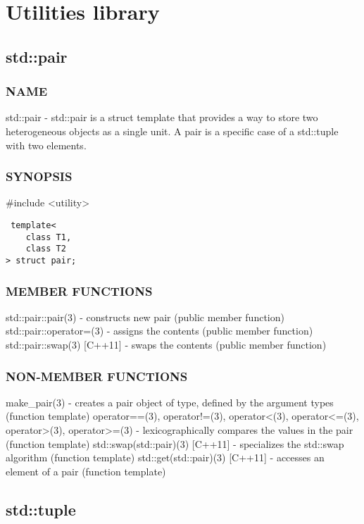 \section{Utilities library}

\subsection{std::pair}

\subsubsection{NAME}
std::pair - std::pair is a struct template that provides a way to store two heterogeneous objects as a single unit. A pair is a specific case of a std::tuple with two elements.

\subsubsection{SYNOPSIS}
\#include <utility>

\begin{lstlisting}
 template<
    class T1,
    class T2
> struct pair;
\end{lstlisting}

\subsubsection{MEMBER FUNCTIONS}
std::pair::pair(3) - constructs new pair  (public member function)
std::pair::operator=(3) - assigns the contents  (public member function)
std::pair::swap(3) [C++11] - swaps the contents   (public member function)

\subsubsection{NON-MEMBER FUNCTIONS}
make\_pair(3) - creates a pair object of type, defined by the argument types  (function template)
operator==(3), operator!=(3), operator<(3), operator<=(3), operator>(3), operator>=(3) - lexicographically compares the values in the pair   (function template)
std::swap(std::pair)(3) [C++11] - specializes the std::swap algorithm   (function template)
std::get(std::pair)(3) [C++11] - accesses an element of a pair   (function template)


\subsection{std::tuple}

